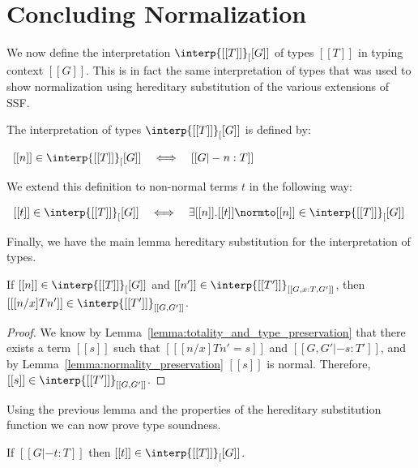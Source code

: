 \section{Concluding Normalization}
\label{sec:concluding_normalization}
We now define the interpretation $\interp{[[T]]}_[[G]]$ of types
$[[T]]$ in typing context $[[G]]$.  This is in fact the same
interpretation of types that was used to show normalization using
hereditary substitution of the various extensions of SSF.
\begin{definition}
  \label{def:semantics}
  The interpretation of types $\interp{[[T]]}_[[G]]$ is defined by:
  \begin{center}
    \begin{math}
      \begin{array}{lll}
        [[n]] \in \interp{[[T]]}_[[G]] & \iff & [[G |- n : T]]
      \end{array}
    \end{math}
  \end{center}
  We extend this definition to non-normal terms $t$ in the following way:
  \begin{center}
    \begin{math}
      \begin{array}{lll}
        [[t]] \in \interp{[[T]]}_[[G]] & \iff & \exists [[n]].[[t]] \normto [[n]] \in \interp{[[T]]}_[[G]]
      \end{array}
    \end{math}
  \end{center}
\end{definition}
Finally, we have the main lemma hereditary substitution for the
interpretation of types.
\begin{lemma}
  \label{lemma:substitution_for_the_interpretation_of_types}
  If $[[n]] \in \interp{[[T]]}_[[G]]$ and $[[n']] \in \interp{[[T']]}_{[[G,x:T,G']]}$, then
  $[[ [n/x] T n']] \in \interp{[[T']]}_{[[G,G']]}$.
\end{lemma}
\begin{proof}
  We know by Lemma~\ref{lemma:totality_and_type_preservation} that there exists a term $[[s]]$ such that
  $[[ [n/x] T n' = s]]$ and $[[G,G' |- s:T']]$, and by Lemma~\ref{lemma:normality_preservation} $[[s]]$ is
  normal.  Therefore, $[[s]] \in \interp{[[T']]}_{[[G,G']]}$.
\end{proof}
Using the previous lemma and the properties of the hereditary
substitution function we can now prove type soundness.
\begin{thm}
  \label{theorem:type_soundness}
  If $[[G |- t : T]]$ then $[[t]] \in \interp{[[T]]}_[[G]]$.
\end{thm}
